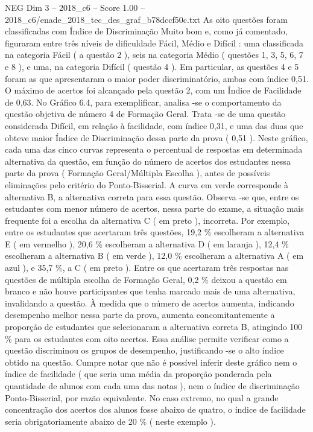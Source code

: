 \begin{textsample}{NEG Dim 3 – 2018\_c6 – Score 1.00 – 2018\_c6/enade\_2018\_tec\_des\_graf\_b78dccf50c.txt}
As oito questões foram classificadas com Índice de Discriminação Muito bom e, como já comentado, figuraram entre três níveis de dificuldade Fácil, Médio e Difícil : uma classificada na categoria Fácil ( a questão 2 ), seis na categoria Médio ( questões 1, 3, 5, 6, 7 e 8 ), e uma, na categoria Difícil ( questão 4 ).
Em particular, as questões 4 e 5 foram as que apresentaram o maior poder discriminatório, ambas com índice 0,51.
O máximo de acertos foi alcançado pela questão 2, com um Índice de Facilidade de 0,63.
No Gráfico 6.4, para exemplificar, analisa -se o comportamento da questão objetiva de número 4 de Formação Geral.
Trata -se de uma questão considerada Difícil, em relação à facilidade, com índice 0,31, e uma das duas que obteve maior Índice de Discriminação dessa parte da prova ( 0,51 ).
Neste gráfico, cada uma das cinco curvas representa o percentual de respostas em determinada alternativa da questão, em função do número de acertos dos estudantes nessa parte da prova ( Formação Geral/Múltipla Escolha ), antes de possíveis eliminações pelo critério do Ponto-Bisserial.
A curva em verde corresponde à alternativa B, a alternativa correta para essa questão.
Observa -se que, entre os estudantes com menor número de acertos, nessa parte do exame, a situação mais frequente foi a escolha da alternativa C ( em preto ), incorreta.
Por exemplo, entre os estudantes que acertaram três questões, 19,2 \% escolheram a alternativa E ( em vermelho ), 20,6 \% escolheram a alternativa D ( em laranja ), 12,4 \% escolheram a alternativa B ( em verde ), 12,0 \% escolheram a alternativa A ( em azul ), e 35,7 \%, a C ( em preto ).
Entre os que acertaram três respostas nas questões de múltipla escolha de Formação Geral, 0,2 \% deixou a questão em branco e não houve participantes que tenha marcado mais de uma alternativa, invalidando a questão.
À medida que o número de acertos aumenta, indicando desempenho melhor nessa parte da prova, aumenta concomitantemente a proporção de estudantes que selecionaram a alternativa correta B, atingindo 100 \% para os estudantes com oito acertos.
Essa análise permite verificar como a questão discriminou os grupos de desempenho, justificando -se o alto índice obtido na questão.
Cumpre notar que não é possível inferir deste gráfico nem o índice de facilidade ( que seria uma média da proporção ponderada pela quantidade de alunos com cada uma das notas ), nem o índice de discriminação Ponto-Bisserial, por razão equivalente.
No caso extremo, no qual a grande concentração dos acertos dos alunos fosse abaixo de quatro, o índice de facilidade seria obrigatoriamente abaixo de 20 \% ( neste exemplo ).

\end{textsample}
